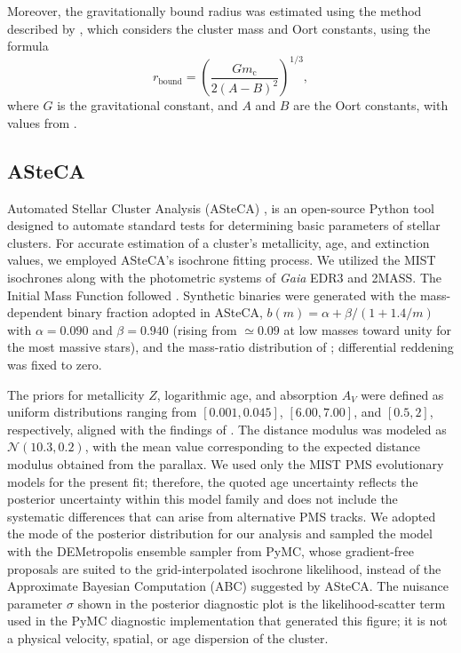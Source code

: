 \documentclass{aa}
\begin{document}
Moreover, the gravitationally bound radius was estimated using the method described by \citet{1998MNRAS.299..955P}, which considers the cluster mass and Oort constants, using the formula
\begin{equation}
	r_\mathrm{bound} = \left( \frac{Gm_{\mathrm{c}}}{2(A-B)^2} \right)^{1/3},
\end{equation}
where $G$ is the gravitational constant, and $A$ and $B$ are the Oort constants, with values from \citet{2017MNRAS.468L..63B}.

\subsection{ASteCA}
Automated Stellar Cluster Analysis (ASteCA) \citep{2015A&A...576A...6P}, is an open-source Python tool designed to automate standard tests for determining basic parameters of stellar clusters. For accurate estimation of a cluster's metallicity, age, and extinction values, we employed ASteCA's isochrone fitting process. We utilized the \textsc{MIST} isochrones \citep{2016ApJS..222....8D, 2016ApJ...823..102C} along with the photometric systems of \textit{Gaia} EDR3 and \textsc{2MASS}. The Initial Mass Function followed \citet{2014ApJ...796...75C}. Synthetic binaries were generated with the mass-dependent binary fraction adopted in ASteCA, $b(m)=\alpha+\beta/(1+1.4/m)$ with $\alpha = 0.090$ and $\beta = 0.940$ (rising from $\simeq0.09$ at low masses toward unity for the most massive stars), and the mass-ratio distribution of \citet{2013ARA&A..51..269D}; differential reddening was fixed to zero.

The priors for metallicity $Z$, logarithmic age, and absorption $A_V$ were defined as uniform distributions ranging from $[0.001, 0.045]$, $[6.00, 7.00]$, and $[0.5, 2]$, respectively, aligned with the findings of \cite{2024arXiv240301030P}. The distance modulus was modeled as $\mathcal{N}(10.3, 0.2)$, with the mean value corresponding to the expected distance modulus obtained from the parallax. We used only the \textsc{MIST} PMS evolutionary models for the present fit; therefore, the quoted age uncertainty reflects the posterior uncertainty within this model family and does not include the systematic differences that can arise from alternative PMS tracks. We adopted the mode of the posterior distribution for our analysis and sampled the model with the DEMetropolis ensemble sampler from PyMC, whose gradient-free proposals are suited to the grid-interpolated isochrone likelihood, instead of the Approximate Bayesian Computation (ABC) suggested by ASteCA. The nuisance parameter $\sigma$ shown in the posterior diagnostic plot is the likelihood-scatter term used in the PyMC diagnostic implementation that generated this figure; it is not a physical velocity, spatial, or age dispersion of the cluster.
\end{document}
